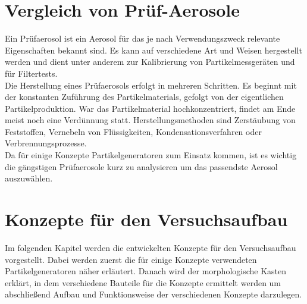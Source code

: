 \chapter{Vergleich von Pr\"{u}f-Aerosole}\label{ch:aerosol}
Ein Pr\"{u}faerosol ist ein Aerosol f\"{u}r das je nach Verwendungszweck relevante Eigenschaften bekannt sind. Es kann auf verschiedene Art und Weisen hergestellt werden und dient unter anderem zur Kalibrierung von Partikelmessger\"{a}ten und f\"{u}r Filtertests.\\
Die Herstellung eines Pr\"{u}faerosols erfolgt in mehreren Schritten. Es beginnt mit der konstanten Zuf\"{u}hrung des Partikelmaterials, gefolgt von der eigentlichen Partikelproduktion. War das Partikelmaterial hochkonzentriert, findet am Ende meist noch eine Verd\"{u}nnung statt. Herstellungsmethoden sind Zerst\"{a}ubung von Feststoffen, Vernebeln von Fl\"{u}ssigkeiten, Kondensationsverfahren oder Verbrennungsprozesse.\\
Da f\"{u}r einige Konzepte Partikelgeneratoren zum Einsatz kommen, ist es wichtig die g\"{a}ngstigen Pr\"{u}faerosole kurz zu analysieren um das passendste Aerosol auszuw\"{a}hlen.








\chapter{Konzepte f\"{u}r den Versuchsaufbau}\label{ch:concepts}
Im folgenden Kapitel werden die entwickelten Konzepte f\"{u}r den Versuchsaufbau vorgestellt. Dabei werden zuerst die f\"{u}r einige Konzepte verwendeten Partikelgeneratoren n\"{a}her erl\"{a}utert. Danach wird der morphologische Kasten erkl\"{a}rt, in dem verschiedene Bauteile f\"{u}r die Konzepte ermittelt werden um abschlie{\ss}end Aufbau und Funktionsweise der verschiedenen Konzepte darzulegen.








